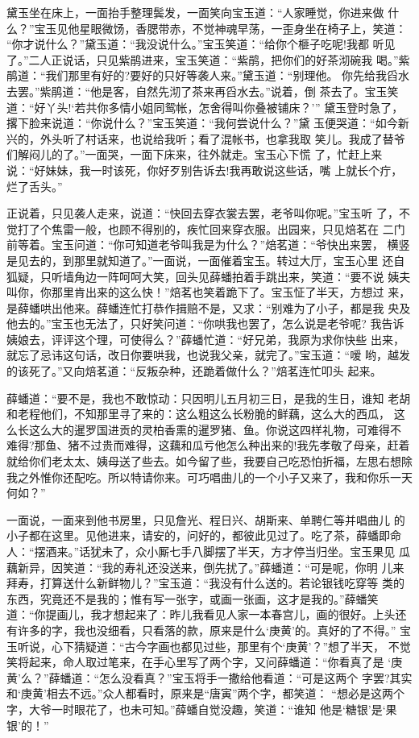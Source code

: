 黛玉坐在床上，一面抬手整理鬓发，一面笑向宝玉道：“人家睡觉，你进来做
什么？”宝玉见他星眼微饧，香腮带赤，不觉神魂早荡，一歪身坐在椅子上，笑道：
“你才说什么？”黛玉道：“我没说什么。”宝玉笑道：“给你个榧子吃呢!我都
听见了。”二人正说话，只见紫鹃进来，宝玉笑道：“紫鹃，把你们的好茶沏碗我
喝。”紫鹃道：“我们那里有好的?要好的只好等袭人来。”黛玉道：“别理他。
你先给我舀水去罢。”紫鹃道：“他是客，自然先沏了茶来再舀水去。”说着，倒
茶去了。宝玉笑道：“好丫头!‘若共你多情小姐同鸳帐，怎舍得叫你叠被铺床？’”
黛玉登时急了，撂下脸来说道：“你说什么？”宝玉笑道：“我何尝说什么？”黛
玉便哭道：“如今新兴的，外头听了村话来，也说给我听；看了混帐书，也拿我取
笑儿。我成了替爷们解闷儿的了。”一面哭，一面下床来，往外就走。宝玉心下慌
了，忙赶上来说：“好妹妹，我一时该死，你好歹别告诉去!我再敢说这些话，嘴
上就长个疔，烂了舌头。”

正说着，只见袭人走来，说道：“快回去穿衣裳去罢，老爷叫你呢。”宝玉听
了，不觉打了个焦雷一般，也顾不得别的，疾忙回来穿衣服。出园来，只见焙茗在
二门前等着。宝玉问道：“你可知道老爷叫我是为什么？”焙茗道：“爷快出来罢，
横竖是见去的，到那里就知道了。”一面说，一面催着宝玉。转过大厅，宝玉心里
还自狐疑，只听墙角边一阵呵呵大笑，回头见薛蟠拍着手跳出来，笑道：“要不说
姨夫叫你，你那里肯出来的这么快！”焙茗也笑着跪下了。宝玉怔了半天，方想过
来，是薛蟠哄出他来。薛蟠连忙打恭作揖赔不是，又求：“别难为了小子，都是我
央及他去的。”宝玉也无法了，只好笑问道：“你哄我也罢了，怎么说是老爷呢?
我告诉姨娘去，评评这个理，可使得么？”薛蟠忙道：“好兄弟，我原为求你快些
出来，就忘了忌讳这句话，改日你要哄我，也说我父亲，就完了。”宝玉道：“嗳
哟，越发的该死了。”又向焙茗道：“反叛杂种，还跪着做什么？”焙茗连忙叩头
起来。

薛蟠道：“要不是，我也不敢惊动：只因明儿五月初三日，是我的生日，谁知
老胡和老程他们，不知那里寻了来的：这么粗这么长粉脆的鲜藕，这么大的西瓜，
这么长这么大的暹罗国进贡的灵柏香熏的暹罗猪、鱼。你说这四样礼物，可难得不
难得?那鱼、猪不过贵而难得，这藕和瓜亏他怎么种出来的!我先孝敬了母亲，赶着
就给你们老太太、姨母送了些去。如今留了些，我要自己吃恐怕折福，左思右想除
我之外惟你还配吃。所以特请你来。可巧唱曲儿的一个小子又来了，我和你乐一天
何如？”

一面说，一面来到他书房里，只见詹光、程日兴、胡斯来、单聘仁等并唱曲儿
的小子都在这里。见他进来，请安的，问好的，都彼此见过了。吃了茶，薛蟠即命
人：“摆酒来。”话犹未了，众小厮七手八脚摆了半天，方才停当归坐。宝玉果见
瓜藕新异，因笑道：“我的寿礼还没送来，倒先扰了。”薛蟠道：“可是呢，你明
儿来拜寿，打算送什么新鲜物儿？”宝玉道：“我没有什么送的。若论银钱吃穿等
类的东西，究竟还不是我的；惟有写一张字，或画一张画，这才是我的。”薛蟠笑
道：“你提画儿，我才想起来了：昨儿我看见人家一本春宫儿，画的很好。上头还
有许多的字，我也没细看，只看落的款，原来是什么‘庚黄’的。真好的了不得。”
宝玉听说，心下猜疑道：“古今字画也都见过些，那里有个‘庚黄’？”想了半天，
不觉笑将起来，命人取过笔来，在手心里写了两个字，又问薛蟠道：“你看真了是
‘庚黄’么？”薛蟠道：“怎么没看真？”宝玉将手一撒给他看道：“可是这两个
字罢?其实和‘庚黄’相去不远。”众人都看时，原来是“唐寅”两个字，都笑道：
“想必是这两个字，大爷一时眼花了，也未可知。”薛蟠自觉没趣，笑道：“谁知
他是‘糖银’是‘果银’的！”

